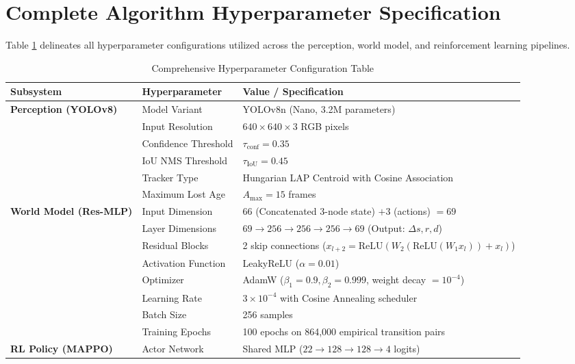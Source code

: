 \section{Complete Algorithm Hyperparameter Specification}
Table \ref{tab:all_hyperparams} delineates all hyperparameter configurations utilized across the perception, world model, and reinforcement learning pipelines.

\begin{table}[htbp]
\centering
\small
\caption{Comprehensive Hyperparameter Configuration Table}
\label{tab:all_hyperparams}
\begin{tabularx}{\textwidth}{|p{3.5cm}|p{4.2cm}|X|}
\hline
\textbf{Subsystem} & \textbf{Hyperparameter} & \textbf{Value / Specification} \\ \hline
\textbf{Perception (YOLOv8)} & Model Variant & YOLOv8n (Nano, 3.2M parameters) \\ \cline{2-3}
& Input Resolution & $640 \times 640 \times 3$ RGB pixels \\ \cline{2-3}
& Confidence Threshold & $\tau_{\text{conf}} = 0.35$ \\ \cline{2-3}
& IoU NMS Threshold & $\tau_{\text{IoU}} = 0.45$ \\ \cline{2-3}
& Tracker Type & Hungarian LAP Centroid with Cosine Association \\ \cline{2-3}
& Maximum Lost Age & $A_{\max} = 15$ frames \\ \hline
\textbf{World Model (Res-MLP)} & Input Dimension & $66$ (Concatenated 3-node state) $+ 3$ (actions) $= 69$ \\ \cline{2-3}
& Layer Dimensions & $69 \rightarrow 256 \rightarrow 256 \rightarrow 256 \rightarrow 69$ (Output: $\Delta s, r, d$) \\ \cline{2-3}
& Residual Blocks & 2 skip connections ($x_{l+2} = \text{ReLU}(W_2(\text{ReLU}(W_1 x_l)) + x_l)$) \\ \cline{2-3}
& Activation Function & LeakyReLU ($\alpha = 0.01$) \\ \cline{2-3}
& Optimizer & AdamW ($\beta_1 = 0.9, \beta_2 = 0.999$, weight decay $= 10^{-4}$) \\ \cline{2-3}
& Learning Rate & $3 \times 10^{-4}$ with Cosine Annealing scheduler \\ \cline{2-3}
& Batch Size & 256 samples \\ \cline{2-3}
& Training Epochs & 100 epochs on 864,000 empirical transition pairs \\ \hline
\textbf{RL Policy (MAPPO)} & Actor Network & Shared MLP ($22 \rightarrow 128 \rightarrow 128 \rightarrow 4$ logits) \\ \cline{2-3}

\end{tabularx}
\end{table}
